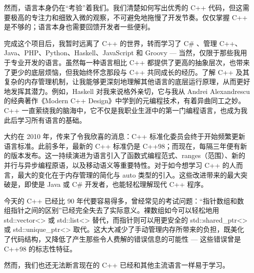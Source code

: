 然而，语言本身仍在“考验”着我们。我们清楚如何写出优秀的 C++ 代码，但这需要极高的专注力和细致入微的观察，不可避免地拖慢了开发节奏。仅仅掌握 C++ 是不够的；语言本身也需要回馈开发者一些便利。

完成这个项目后，我暂时远离了 C++ 的世界，转而学习了 C\# 、管理 C++、Java、PHP、Python、Haskell、JavaScript 和 Groovy --- 当然，仅限于那些我用于专业开发的语言。虽然每一种语言相比 C++ 都提供了更高的抽象层次，也带来了更少的底层烦恼，但我始终怀念那段与 C++ 共同成长的经历。了解 C++ 及其复杂的内存管理机制，让我能够更深刻地理解其他语言的底层运行原理，从而更好地发挥其潜力。例如，Haskell 对我来说格外亲切，它与我从 Andrei Alexandrescu 的经典著作《Modern C++ Design》中学到的元编程技术，有着异曲同工之妙。C++ 一直萦绕我的脑海中，它不仅是我职业生涯中的第一门编程语言，也成为我此后学习所有语言的基础。

大约在 2010 年，传来了令我欣喜的消息：C++ 标准化委员会终于开始频繁更新语言标准。此前多年，最新的 C++ 标准仍是 C++98；而现在，每隔三年便有新的版本发布。这一持续演进为语言引入了函数式编程范式、ranges（范围）、新的并行与异步编程原语，以及移动语义等重要特性。对于如今想学习 C++ 的人而言，最大的变化在于内存管理的简化与 auto 类型的引入。这些改进带来的最大突破是，即使是 Java 或 C\# 开发者，也能轻松理解现代 C++ 程序。

今天的 C++ 已经比 90 年代要容易得多，曾经常见的考试问题：“指针数组和数组指针之间的区别”已经完全失去了实际意义。裸数组如今可以轻松地用 std::vector<> 或 std::list<> 替代，而指针则可以用更安全的 std::shared\_ptr<> 或 std::unique\_ptr<> 取代。这大大减少了手动管理内存所带来的负担，既美化了代码结构，又降低了产生那些令人费解的错误信息的可能性 --- 这些错误曾是 C++98 的标志性特征。

然而，我们也还无法断言现在的 C++ 已经和其他主流语言一样易于学习。
























